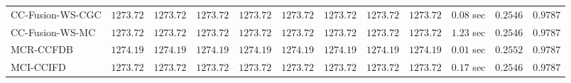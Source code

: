 \begin{table}[H]
\begin{tabular}{lrrrrrrrrrrr}
    CC-Fusion-WS-CGC & $      1273.72$ & $      1273.72$ & $      1273.72$ & $      1273.72$ & $      1273.72$ & $      1273.72$ & $      1273.72$ & $      1273.72$ & $         0.08$ sec    & $       0.2546$  & $       0.9787$ \\ 
     CC-Fusion-WS-MC & $      1273.72$ & $      1273.72$ & $      1273.72$ & $      1273.72$ & $      1273.72$ & $      1273.72$ & $      1273.72$ & $      1273.72$ & $         1.23$ sec    & $       0.2546$  & $       0.9787$ \\ 
\cmidrule{1-1} 
           MCR-CCFDB & $      1274.19$ & $      1274.19$ & $      1274.19$ & $      1274.19$ & $      1274.19$ & $      1274.19$ & $      1274.19$ & $      1274.19$ & $         0.01$ sec    & $       0.2552$  & $       0.9787$ \\ 
\cmidrule{1-1} 
           MCI-CCIFD & $      1273.72$ & $      1273.72$ & $      1273.72$ & $      1273.72$ & $      1273.72$ & $      1273.72$ & $      1273.72$ & $      1273.72$ & $         0.17$ sec    & $       0.2546$  & $       0.9787$ \\ 
\bottomrule
\end{tabular}
\end{table}

